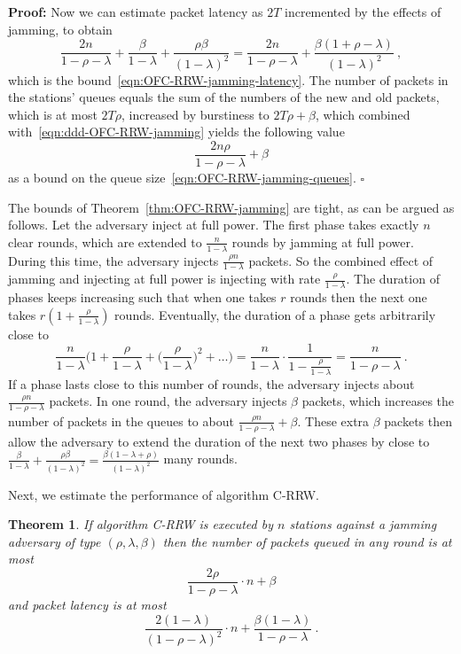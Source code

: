 \documentclass[11pt]{article}
\newcommand{\qed}{\hfill $\square$}
\newtheorem{theorem}{Theorem}
\newenvironment{proof}{\noindent\textbf{Proof: }}{\qed \smallbreak}
\begin{document}
\begin{proof}
Now we can estimate packet latency as $2T$ incremented by the effects of jamming, to obtain
\[
\frac{2n}{1-\rho-\lambda} + \frac{\beta}{1-\lambda} + \frac{\rho\beta}{(1-\lambda)^2}
=
\frac{2n}{1-\rho-\lambda} + \frac{\beta(1+\rho-\lambda) }{(1-\lambda)^2}
\ ,
\]
which is the bound~\eqref{eqn:OFC-RRW-jamming-latency}.
The number of packets in the stations' queues equals the sum of the numbers of the new and old packets, which is at most $2T\rho$, increased by burstiness to $2T\rho+\beta$, which combined with~\eqref{eqn:ddd-OFC-RRW-jamming} yields the following value
\[
\frac{2n\rho}{1-\rho-\lambda} +\beta
\]
as a bound on the queue size~\eqref{eqn:OFC-RRW-jamming-queues}.
\end{proof}

The bounds of Theorem~\ref{thm:OFC-RRW-jamming} are tight, as can be argued as follows. 
Let the adversary inject at full power.
The first phase takes exactly $n$ clear rounds, which are extended to $\frac{n}{1-\lambda}$ rounds  by jamming at full power.
During this time, the adversary injects $\frac{\rho n}{1-\lambda}$ packets.
So the combined effect of jamming and injecting at full power is injecting with rate $\frac{\rho}{1-\lambda}$. 
The duration of phases keeps increasing such that when one takes $r$ rounds then the next one takes $r(1+\frac{\rho }{1-\lambda})$ rounds.
Eventually, the duration of a phase gets arbitrarily close to 
\[
\frac{n}{1-\lambda} \bigl(1+ \frac{\rho}{1-\lambda} + \bigl(\frac{\rho}{1-\lambda}\bigr)^2+\ldots \bigr) = \frac{n}{1-\lambda} \cdot \frac{1}{1-\frac{\rho}{1-\lambda}} = \frac{n}{1-\rho-\lambda}
\ .
\]
If a phase lasts close to this number of rounds, the adversary injects about $\frac{\rho n}{1-\rho-\lambda}$ packets.  
In one round, the adversary injects $\beta$ packets, which increases the number of packets in the queues to about $\frac{\rho n}{1-\rho-\lambda}+\beta$.
These extra $\beta$ packets then allow the adversary to extend the duration of the next two phases by close to $\frac{\beta}{1-\lambda}+\frac{\rho\beta}{(1-\lambda)^2}=\frac{\beta(1-\lambda+\rho) }{(1-\lambda)^2}$ many rounds.

Next, we estimate the performance of algorithm \textsc{C-RRW}.


\begin{theorem}
\label{thm:C-RRW-jamming}
If algorithm \textsc{C-RRW} is executed by $n$ stations against a jamming adversary of type $(\rho,\lambda,\beta)$ then the number of packets queued in any round is at most
\begin{equation}
\label{eqn:C-RRW-jamming-queues}
\frac{2\rho}{1-\rho-\lambda} \cdot n+\beta
\end{equation}
and packet latency is at most
\begin{equation}
\label{eqn:C-RRW-jamming-latency}
\frac{2(1-\lambda)}{(1-\rho-\lambda)^2}\cdot n+ \frac{\beta(1-\lambda)}{1-\rho-\lambda}
\ .
\end{equation}
\end{theorem}
\end{document}
